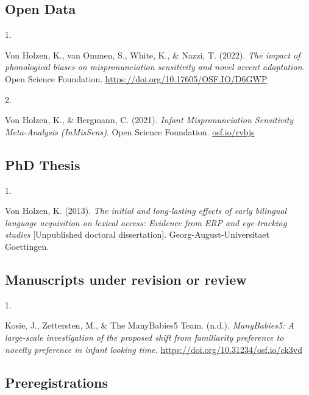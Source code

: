 \documentclass[10pt,a4paper,]{article}
\newlength{\cslhangindent}
\newlength{\csllabelwidth}
\newcommand{\CSLLeftMargin}[1]{\parbox[t]{\csllabelwidth}{\hfill #1~}}
\newcommand{\CSLRightInline}[1]{\parbox[t]{\linewidth - \cslhangindent - \csllabelwidth}{#1}\vspace{0.8ex}}
\begin{document}
\hypertarget{open-data}{%
\subsection{Open Data}\label{open-data}}

\hypertarget{bibliography}{}
\leavevmode{}%
\CSLLeftMargin{1. }%
\CSLRightInline{Von Holzen, K., van Ommen, S., White, K., \& Nazzi, T.
(2022). \emph{The impact of phonological biases on mispronunciation
sensitivity and novel accent adaptation}. Open Science Foundation.
\url{https://doi.org/10.17605/OSF.IO/D6GWP}}

\leavevmode{}%
\CSLLeftMargin{2. }%
\CSLRightInline{Von Holzen, K., \& Bergmann, C. (2021). \emph{Infant
Mispronunciation Sensitivity Meta-Analysis (InMisSens)}. Open Science
Foundation. \href{https://osf.io/rvbjs}{osf.io/rvbjs}}

\hypertarget{phd-thesis}{%
\subsection{PhD Thesis}\label{phd-thesis}}

\hypertarget{bibliography}{}
\leavevmode{}%
\CSLLeftMargin{1. }%
\CSLRightInline{Von Holzen, K. (2013). \emph{The initial and
long-lasting effects of early bilingual language acquisition on lexical
access: Evidence from ERP and eye-tracking studies} {[}Unpublished
doctoral dissertation{]}. Georg-August-Universitaet Goettingen.}

\hypertarget{manuscripts-under-revision-or-review}{%
\subsection{Manuscripts under revision or
review}\label{manuscripts-under-revision-or-review}}

\hypertarget{bibliography}{}
\leavevmode{}%
\CSLLeftMargin{1. }%
\CSLRightInline{Kosie, J., Zettersten, M., \& The ManyBabies5 Team.
(n.d.). \emph{ManyBabies5: A large-scale investigation of the proposed
shift from familiarity preference to novelty preference in infant
looking time.} \url{https://doi.org/10.31234/osf.io/ck3vd}}

\hypertarget{preregistrations}{%
\subsection{Preregistrations}\label{preregistrations}}
\end{document}
